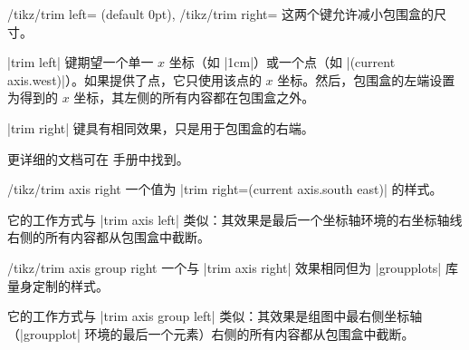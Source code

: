\begin{keylist}{%
    /tikz/trim left= (default 0pt),
    /tikz/trim right=%
}
    这两个键允许减小包围盒的尺寸。

    |trim left| 键期望一个单一 $x$ 坐标（如 |1cm|）或一个点（如 |(current axis.west)|）。如果提供了点，它只使用该点的 $x$ 坐标。然后，包围盒的左端设置为得到的 $x$ 坐标，其左侧的所有内容都在包围盒之外。

    |trim right| 键具有相同效果，只是用于包围盒的右端。

    更详细的文档可在 \Tikz{} 手册中找到。
\end{keylist}


\begin{stylekey}{/tikz/trim axis right}
    一个值为 |trim right=(current axis.south east)| 的样式。

    它的工作方式与 |trim axis left| 类似：其效果是最后一个坐标轴环境的右坐标轴线右侧的所有内容都从包围盒中截断。
\end{stylekey}


\begin{stylekey}{/tikz/trim axis group right}
    一个与 |trim axis right| 效果相同但为 |groupplots| 库量身定制的样式。

    它的工作方式与 |trim axis group left| 类似：其效果是组图中最右侧坐标轴（|groupplot| 环境的最后一个元素）右侧的所有内容都从包围盒中截断。
\end{stylekey}


